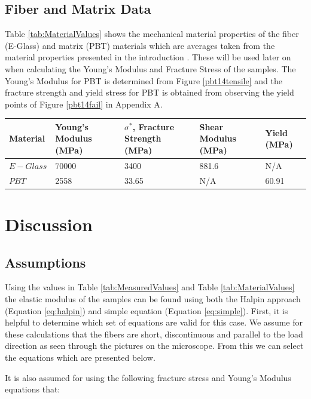 \documentclass[11pt]{article}
\begin{document}
\subsection{Fiber and Matrix Data}
Table \ref{tab:MaterialValues} shows the mechanical material properties of the fiber (E-Glass) and matrix (PBT) materials which are averages taken from the material properties presented in the introduction \cite{PBTmechProperties} \cite{course_notes}. These will be used later on when calculating the Young's Modulus and Fracture Stress of the samples. The Young's Modulus for PBT is determined from Figure \ref{pbt14tensile} and the fracture strength and yield stress for PBT is obtained from observing the yield points of Figure \ref{pbt14fail} in Appendix A.

\onehalfspacing
\begin{center}
 \label{tab:MaterialValues}
\begin{tabular}{p{2cm} || p{} | p{} | p{2.5cm} | p{} }
\hline
Material & Young's Modulus (MPa) & \(\sigma^*\), Fracture Strength (MPa) & Shear Modulus (MPa) & Yield (MPa)\\
\hline
\hline
\(E-Glass\) & 70000 &  3400 & 881.6 & N/A \\
\(PBT\) & 2558 & 33.65 & N/A & 60.91\\
\hline
\end{tabular}
\end{center}
\singlespacing

\section{Discussion}

\subsection{Assumptions}
Using the values in Table \ref{tab:MeasuredValues} and Table \ref{tab:MaterialValues} the elastic modulus of the samples can be found using both the Halpin approach (Equation \ref{eq:halpin}) and simple equation (Equation \ref{eq:simple}). First, it is helpful to determine which set of equations are valid for this case. We assume for these calculations that the fibers are short, discontinuous and parallel to the load direction as seen through the pictures on the microscope. From this we can select the equations which are presented below. 

It is also assumed for using the following fracture stress and Young's Modulus equations that:
\end{document}
